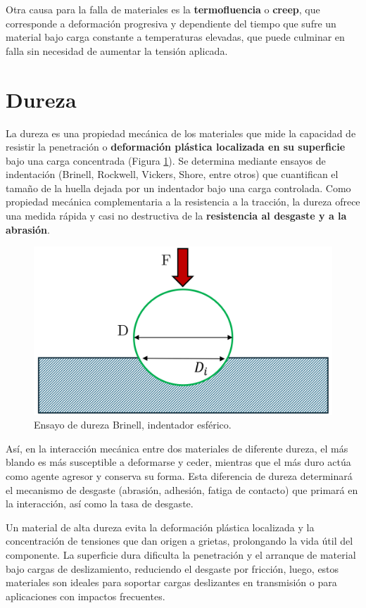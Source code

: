 Otra causa para la falla de materiales es la \textbf{termofluencia} o \textbf{creep}, que corresponde a deformación progresiva y dependiente del tiempo que sufre un material bajo carga constante a temperaturas elevadas, que puede culminar en falla sin necesidad de aumentar la tensión aplicada. 

\section{Dureza}

La dureza es una propiedad mecánica de los materiales que mide la capacidad de resistir la penetración o \textbf{deformación plástica localizada en su superficie} bajo una carga concentrada (Figura \ref{dur}). Se determina mediante ensayos de indentación (Brinell, Rockwell, Vickers, Shore, entre otros) que cuantifican el tamaño de la huella dejada por un indentador bajo una carga controlada. Como propiedad mecánica complementaria a la resistencia a la tracción, la dureza ofrece una medida rápida y casi no destructiva de la \textbf{resistencia al desgaste y a la abrasión}.

\begin{figure}[h!]
    \centering
    \includegraphics[width=0.6\linewidth]{imgs/indent.png}
    \caption{Ensayo de dureza Brinell, indentador esférico.}
    \label{dur}
\end{figure}

Así, en la interacción mecánica entre dos materiales de diferente dureza, el más blando es más susceptible a deformarse y ceder, mientras que el más duro actúa como agente agresor y conserva su forma. Esta diferencia de dureza determinará el mecanismo de desgaste (abrasión, adhesión, fatiga de contacto) que primará en la interacción, así como la tasa de desgaste.

Un material de alta dureza evita la deformación plástica localizada y la concentración de tensiones que dan origen a grietas, prolongando la vida útil del componente. La superficie dura dificulta la penetración y el arranque de material bajo cargas de deslizamiento, reduciendo el desgaste por fricción, luego, estos materiales son ideales para soportar cargas deslizantes en transmisión o para aplicaciones con impactos frecuentes.

